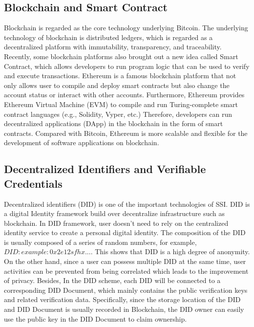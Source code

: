 \documentclass[conference, dvipdfmx]{IEEEtran} %
\begin{document}
\begin{sloppypar}
\subsection{Blockchain and Smart Contract}
Blockchain is regarded as the core technology underlying Bitcoin\cite{bitcoin}. The underlying technology of blockchain is distributed ledgers, which is regarded as a decentralized platform with immutability, transparency, and traceability. Recently, some blockchain platforms also brought out a new idea called Smart Contract\cite{blockchain_smart_contract}, which allows developers to run program logic that can be used to verify and execute transactions. Ethereum\cite{ethereum} is a famous blockchain platform that not only allows user to compile and deploy smart contracts but also change the account status or interact with other accounts. Furthermore, Ethereum provides Ethereum Virtual Machine (EVM) to compile and run Turing-complete smart contract languages (e.g., Solidity, Vyper, etc.) Therefore, developers can run decentralized applications (DApp) in the blockchain in the form of smart contracts. Compared with Bitcoin, Ethereum is more scalable and flexible for the development of software applications on blockchain.

\subsection{Decentralized Identifiers and Verifiable Credentials}

Decentralized identifiers (DID) is one of the important technologies of SSI. DID is a digital Identity framework build over decentralize infrastructure such as blockchain. In DID framework, user doesn't need to rely on the centralized identity service to create a personal digital identity. The composition of the DID is usually composed of a series of random numbers, for example, $DID:example:0x2e12sfhx...$. This shows that DID is a high degree of anonymity. On the other hand, since a user can possess multiple DID at the same time, user activities can be prevented from being correlated which leads to the improvement of privacy. Besides, In the DID scheme, each DID will be connected to a corresponding DID Document, which mainly contains the public verification keys and related verification data. Specifically, since the storage location of the DID and DID Document is usually recorded in Blockchain, the DID owner can easily use the public key in the DID Document to claim ownership.


\end{sloppypar}
\end{document}
